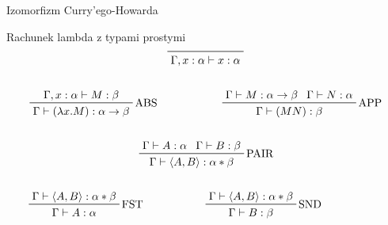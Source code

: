 \documentclass{beamer}
\newcommand{\imp}{\rightarrow}
\begin{document}
\begin{frame}{Izomorfizm Curry'ego-Howarda}
  \begin{block}{Rachunek lambda z typami prostymi}
    $$ \prfaxiom{\Gamma, x:\alpha \vdash x:\alpha} $$

    \pause

    \begin{columns}
      \begin{column}{0.5\textwidth}
        $$ \prftree[r]{ABS}
          {\Gamma, x:\alpha \vdash M:\beta}
          {\Gamma \vdash (\lambda x.M): \alpha \imp \beta}
        $$
      \end{column}

      \begin{column}{0.5\textwidth}
        $$ \prftree[r]{APP}
          {\Gamma \vdash M:\alpha \imp \beta}
          {\Gamma \vdash N:\alpha}
          {\Gamma \vdash (M N): \beta}
        $$
      \end{column}
    \end{columns}

    \pause

    $$ \prftree[r]{PAIR}
      {\Gamma \vdash A:\alpha}
      {\Gamma \vdash B:\beta}
      {\Gamma \vdash \langle A, B \rangle: \alpha * \beta}
    $$

    \begin{columns}
      \begin{column}{0.5\textwidth}
        $$ \prftree[r]{FST}
          {\Gamma \vdash \langle A, B \rangle: \alpha * \beta}
          {\Gamma \vdash A:\alpha}
        $$
      \end{column}

      \begin{column}{0.5\textwidth}
        $$ \prftree[r]{SND}
          {\Gamma \vdash \langle A, B \rangle: \alpha * \beta}
          {\Gamma \vdash B:\beta}
        $$
      \end{column}

      \begin{column}{0.5\textwidth}

      \end{column}
    \end{columns}
  \end{block}
\end{frame}
\end{document}
